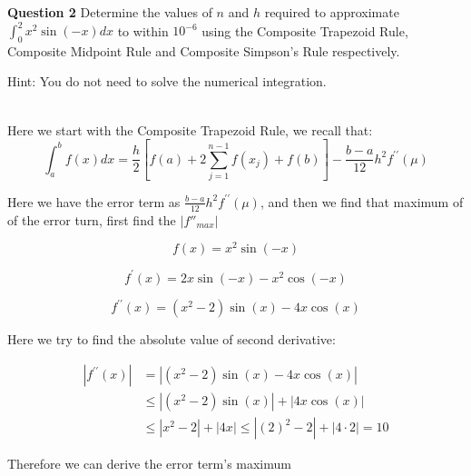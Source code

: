 

\begin{tcolorbox}
\textbf{Question 2} Determine the values of $n$ and $h$ required to approximate $\int_{0}^{2} x^{2} \sin (-x) d x$ to within $10^{-6}$ using the Composite Trapezoid Rule, Composite Midpoint Rule and Composite Simpson's Rule respectively.


Hint: You do not need to solve the numerical integration.
\end{tcolorbox}

\begin{solution}\ \\


Here we start with the Composite Trapezoid Rule, we recall that:
\begin{equation}
	\int_{a}^{b} f(x) d x=\frac{h}{2}\left[f(a)+2 \sum_{j=1}^{n-1} f\left(x_{j}\right)+f(b)\right]-\frac{b-a}{12} h^{2} f^{\prime \prime}(\mu)
\end{equation}


Here we have the error term as $\frac{b-a}{12} h^{2} f^{\prime \prime}(\mu)$, and then we find that maximum of of the error turn, first find the $|f''_{max}|$


 \begin{equation}
f(x)=x^{2} \sin (-x)
\end{equation}


\begin{equation}
f^{\prime}(x)=2 x \sin (-x)-x^{2} \cos (-x)
\end{equation}


\begin{equation}
f^{\prime \prime}(x) =\left(x^{2}-2\right) \sin (x)-4 x \cos (x)
\end{equation}

Here we try to find the absolute value of second derivative:


\begin{equation}
\begin{aligned}
\left|f^{\prime \prime}(x)\right| &=\left|\left(x^{2}-2\right) \sin (x)-4 x \cos (x)\right| \\
&\leq | \left( x^{2}-2\right) \sin (x)|+| 4 x \cos (x) | \\
& \leq\left|x^{2}-2\right|+|4 x| \leq\left|(2)^{2}-2\right|+|4 \cdot 2|=10
\end{aligned}		\label{f''}
\end{equation}



Therefore we can derive the error term's maximum



\end{solution}

